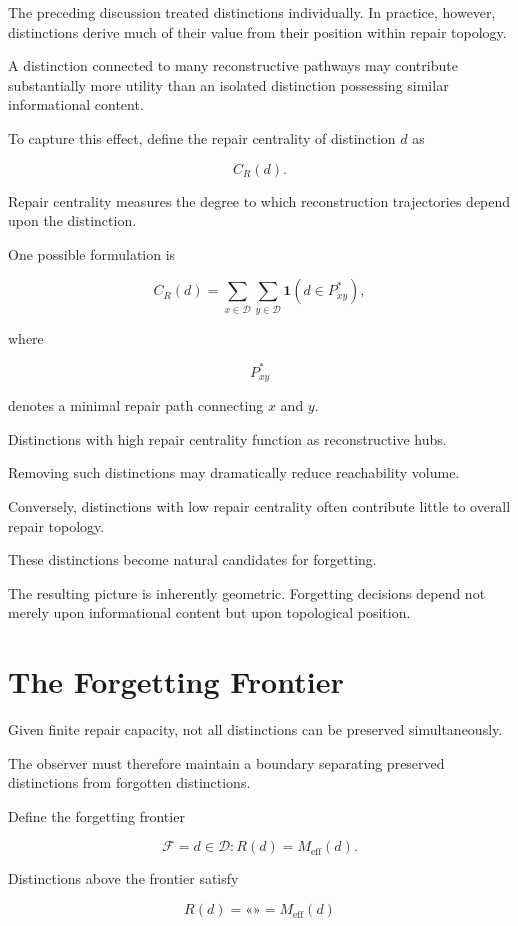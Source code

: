 \documentclass[12pt,oneside]{book}
\theoremstyle{plain} \newtheorem{theorem}{Theorem}[chapter] \newtheorem{lemma}[theorem]{Lemma} \newtheorem{proposition}[theorem]{Proposition} \newtheorem{corollary}[theorem]{Corollary}
\theoremstyle{definition} \newtheorem{definition}[theorem]{Definition} \newtheorem{axiom}[theorem]{Axiom} \newtheorem{construction}[theorem]{Construction}
\theoremstyle{remark} \newtheorem{remark}[theorem]{Remark} \newtheorem{example}[theorem]{Example}
\newcommand{\D}{\mathcal{D}} \newcommand{\R}{\mathcal{R}} \newcommand{\F}{\mathcal{F}} \newcommand{\U}{\mathcal{U}} \newcommand{\M}{\mathcal{M}} \newcommand{\G}{\Gamma}
\begin{document}
The preceding discussion treated distinctions individually. In practice, however, distinctions derive much of their value from their position within repair topology.

A distinction connected to many reconstructive pathways may contribute substantially more utility than an isolated distinction possessing similar informational content.

To capture this effect, define the repair centrality of distinction $d$ as

\[
C_R(d).
\]

Repair centrality measures the degree to which reconstruction trajectories depend upon the distinction.

One possible formulation is

\[
C_R(d)
=
\sum_{x\in\D}
\sum_{y\in\D}
\mathbf 1
\left(
d\in P_{xy}^{*}
\right),
\]

where

\[
P_{xy}^{*}
\]

denotes a minimal repair path connecting $x$ and $y$.

Distinctions with high repair centrality function as reconstructive hubs.

Removing such distinctions may dramatically reduce reachability volume.

Conversely, distinctions with low repair centrality often contribute little to overall repair topology.

These distinctions become natural candidates for forgetting.

The resulting picture is inherently geometric. Forgetting decisions depend not merely upon informational content but upon topological position.

\section{The Forgetting Frontier}

Given finite repair capacity, not all distinctions can be preserved simultaneously.

The observer must therefore maintain a boundary separating preserved distinctions from forgotten distinctions.

Define the forgetting frontier

\[
\mathcal F
=
{
d\in\D
:
R(d)
=
M_{\mathrm{eff}}(d)
}.
\]

Distinctions above the frontier satisfy

\[
R(d)
=
«»
=
M_{\mathrm{eff}}(d)
\]
\end{document}
